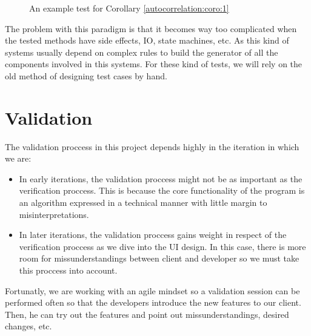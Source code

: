     \begin{figure}[ht!]
      \caption{An example test for Corollary \ref{autocorrelation:coro:1}}
      \label{test_example}
    \end{figure}

    The problem with this paradigm is that it becomes way too complicated when
    the tested methods have side effects, IO, state machines, etc. As this
    kind of systems usually depend on complex rules to build the generator of
    all the components involved in this systems. For these kind of tests, we
    will rely on the old method of designing test cases by hand.\\

\section{Validation}

The validation proccess in this project depends highly in the iteration in which
we are:

\begin{itemize}
  \item In early iterations, the validation proccess might not be as important
  as the verification proccess. This is because the core functionality of the
  program is an algorithm expressed in a technical manner with little margin
  to misinterpretations.
  \item In later iterations, the validation proccess gains weight in respect of
  the verification proccess as we dive into the UI design. In this case, there
  is more room for missunderstandings between client and developer so we must
  take this proccess into account.
\end{itemize}

Fortunatly, we are working with an agile mindset so a validation
session can be performed often so that the developers introduce the new features to
our client. Then, he can try out the features and point out missunderstandings,
desired changes, etc.\\
